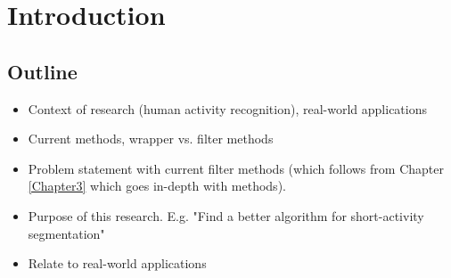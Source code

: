 
\chapter{Introduction}

\label{Chapter1} %



\section{Outline}
\begin{itemize}
  \item Context of research (human activity recognition), real-world applications
  \item Current methods, wrapper vs. filter methods
  \item Problem statement with current filter methods (which follows from Chapter \ref{Chapter3} which goes in-depth with methods).
  \item Purpose of this research. E.g. "Find a better algorithm for short-activity segmentation"
  \item Relate to real-world applications
\end{itemize}